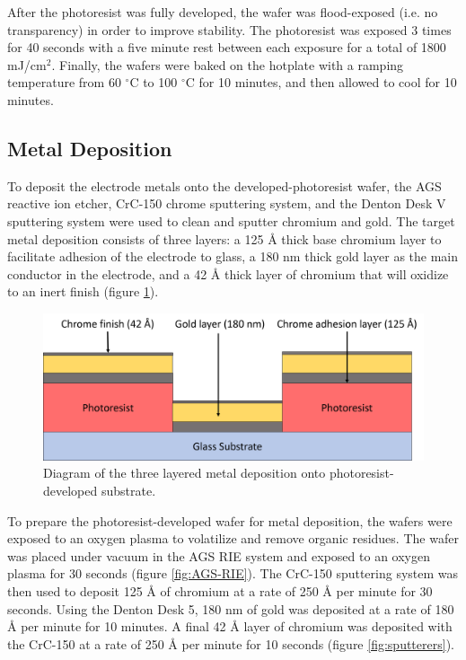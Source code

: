 \par After the photoresist was fully developed, the wafer was flood-exposed (i.e. no transparency) in order to improve stability. The photoresist was exposed 3 times for 40 seconds with a five minute rest between each exposure for a total of 1800 mJ/cm$^2$. Finally, the wafers were baked on the hotplate with a ramping temperature from 60 $^\circ$C to 100 $^\circ$C for 10 minutes, and then allowed to cool for 10 minutes. 

\subsection*{Metal Deposition}

\par To deposit the electrode metals onto the developed-photoresist wafer, the AGS reactive ion etcher, CrC-150 chrome sputtering system, and the Denton Desk V sputtering system were used to clean and sputter chromium and gold. The target metal deposition consists of three layers: a 125 \si{\angstrom} thick base chromium layer to facilitate adhesion of the electrode to glass, a 180 nm thick gold layer as the main conductor in the electrode, and a 42 \si{\angstrom} thick layer of chromium that will oxidize to an inert finish (figure \ref{fig:metal_deposition}).

\begin{figure}[h]
    \centering
    \includegraphics[width=\textwidth]{images/metal_deposition_diagram.png}
    \caption[Diagram of metal deposition onto photoresist-developed substrate]{Diagram of the three layered metal deposition onto photoresist-developed substrate.}
    \label{fig:metal_deposition}
\end{figure}

\par To prepare the photoresist-developed wafer for metal deposition, the wafers were exposed to an oxygen plasma to volatilize and remove organic residues. The wafer was placed under vacuum in the AGS RIE system and exposed to an oxygen plasma for 30 seconds (figure \ref{fig:AGS-RIE}). The CrC-150 sputtering system was then used to deposit 125 \si{\angstrom} of chromium at a rate of 250 \si{\angstrom} per minute for 30 seconds. Using the Denton Desk 5, 180 nm of gold was deposited at a rate of 180 \si{\angstrom} per minute for 10 minutes. A final 42 \si{\angstrom} layer of chromium was deposited with the CrC-150 at a rate of 250 \si{\angstrom} per minute for 10 seconds (figure \ref{fig:sputterers}). 

